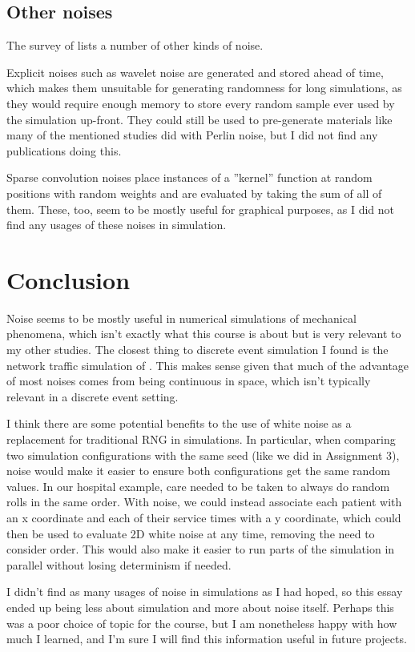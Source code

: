 \documentclass{article}
\begin{document}
\subsection*{Other noises}

The survey of \textcite{lagae_survey_2010} lists a number of other kinds of
noise.

Explicit noises such as wavelet noise are generated and stored ahead of
time, which makes them unsuitable for generating randomness for long
simulations, as they would require enough memory to store every random sample
ever used by the simulation up-front. They could still be used to pre-generate
materials like many of the mentioned studies did with Perlin noise, but I did
not find any publications doing this.

Sparse convolution noises place instances of a ''kernel'' function at random
positions with random weights and are evaluated by taking the sum of all of
them. These, too, seem to be mostly useful for graphical purposes, as I did not
find any usages of these noises in simulation.

\section*{Conclusion}

Noise seems to be mostly useful in numerical simulations of mechanical
phenomena, which isn't exactly what this course is about but is very relevant
to my other studies. The closest thing to discrete event simulation I found is
the network traffic simulation of \textcite{prieto_traffic_2012}. This makes
sense given that much of the advantage of most noises comes from being
continuous in space, which isn't typically relevant in a discrete event
setting.

I think there are some potential benefits to the use of white noise as a
replacement for traditional RNG in simulations. In particular, when comparing
two simulation configurations with the same seed (like we did in Assignment 3),
noise would make it easier to ensure both configurations get the same random
values. In our hospital example, care needed to be taken to always do random
rolls in the same order. With noise, we could instead associate each patient
with an x coordinate and each of their service times with a y coordinate,
which could then be used to evaluate 2D white noise at any time, removing the
need to consider order. This would also make it easier to run parts of the
simulation in parallel without losing determinism if needed.

I didn't find as many usages of noise in simulations as I had hoped, so this
essay ended up being less about simulation and more about noise itself.
Perhaps this was a poor choice of topic for the course, but I am nonetheless
happy with how much I learned, and I'm sure I will find this information useful
in future projects.

\printbibliography
\end{document}
